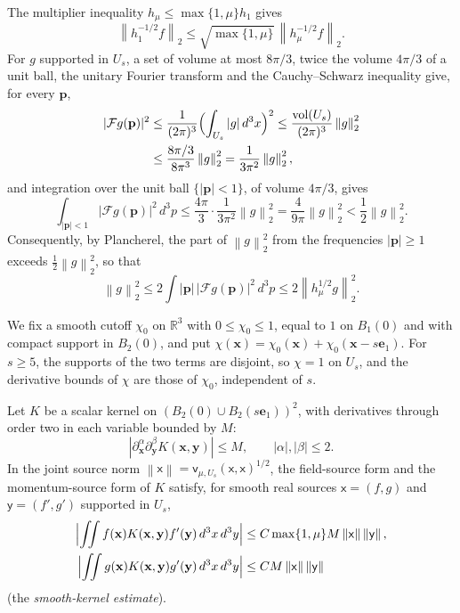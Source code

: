 \documentclass[11pt]{amsart}
\numberwithin{equation}{section}
\theoremstyle{definition}
\newcommand{\R}{\mathbb R}
\newcommand{\vv}{\mathsf v}
\newcommand{\sx}{\mathsf x}
\newcommand{\sy}{\mathsf y}
\newcommand{\bx}{\mathbf x}
\newcommand{\by}{\mathbf y}
\newcommand{\bp}{\mathbf p}
\newcommand{\eone}{\mathbf e_1}
\newcommand{\vol}{\operatorname{vol}}
\newcommand{\norm}[1]{\left\|#1\right\|}
\begin{document}
The multiplier inequality
\(h_\mu\le\max\{1,\mu\}h_1\) gives
\begin{equation}
 \norm{h_1^{-1/2}f}_2
 \le\sqrt{\max\{1,\mu\}}\,
       \norm{h_\mu^{-1/2}f}_2.
 \label{eq:f-comparison}
\end{equation}
For \(g\) supported in \(U_s\), a set of volume at most \(8\pi/3\), twice
the volume \(4\pi/3\) of a unit ball, the unitary Fourier transform and
the Cauchy--Schwarz inequality give, for every \(\bp\),
\begin{align*}
 |\mathcal Fg(\bp)|^2
 &\le\frac1{(2\pi)^3}\Bigl(\int_{U_s}|g|\,d^3x\Bigr)^2
 \le\frac{\vol(U_s)}{(2\pi)^3}\norm{g}_2^2\\
 &\le\frac{8\pi/3}{8\pi^3}\norm{g}_2^2
 =\frac1{3\pi^2}\norm{g}_2^2,
\end{align*}
and integration over the unit ball \(\{|\bp|<1\}\), of volume
\(4\pi/3\), gives
\[
 \int_{|\bp|<1}|\mathcal Fg(\bp)|^2\,d^3p
 \le\frac{4\pi}3\cdot\frac1{3\pi^2}\norm{g}_2^2
 =\frac4{9\pi}\norm{g}_2^2
 <\frac12\norm{g}_2^2.
\]
Consequently, by Plancherel, the part of \(\norm{g}_2^2\) from the
frequencies \(|\bp|\ge1\) exceeds \(\tfrac12\norm{g}_2^2\), so that
\begin{equation}
 \norm{g}_2^2
 \le2\int|\bp|\,|\mathcal Fg(\bp)|^2\,d^3p
 \le2\norm{h_\mu^{1/2}g}_2^2.
 \label{eq:g-comparison}
\end{equation}

We fix a smooth cutoff \(\chi_0\) on \(\R^3\) with
\(0\le\chi_0\le1\), equal to \(1\) on \(B_1(0)\) and with compact
support in \(B_2(0)\), and put
\(\chi(\bx)=\chi_0(\bx)+\chi_0(\bx-s\eone)\). For \(s\ge5\), the
supports of the two terms are disjoint, so \(\chi=1\) on \(U_s\), and
the derivative bounds of \(\chi\) are those of \(\chi_0\), independent
of \(s\).

Let \(K\) be a scalar kernel on
\((B_2(0)\cup B_2(s\eone))^2\), with derivatives through order two in
each variable bounded by \(M\):
\[
 |\partial_\bx^\alpha\partial_\by^\beta K(\bx,\by)|\le M,
 \qquad |\alpha|,|\beta|\le2.
\]
In the joint source norm \(\norm{\sx}=\vv_{\mu,U_s}(\sx,\sx)^{1/2}\),
the field-source form and the momentum-source form of \(K\) satisfy,
for smooth real sources \(\sx=(f,g)\) and \(\sy=(f',g')\) supported in
\(U_s\),
\[
 \begin{split}
 \Bigl|\iint f(\bx)K(\bx,\by)f'(\by)\,d^3x\,d^3y\Bigr|
 &\le C\max\{1,\mu\}M\norm{\sx}\norm{\sy},\\
 \Bigl|\iint g(\bx)K(\bx,\by)g'(\by)\,d^3x\,d^3y\Bigr|
 &\le CM\norm{\sx}\norm{\sy}
 \end{split}
\]
(the \emph{smooth-kernel estimate}).
\end{document}
